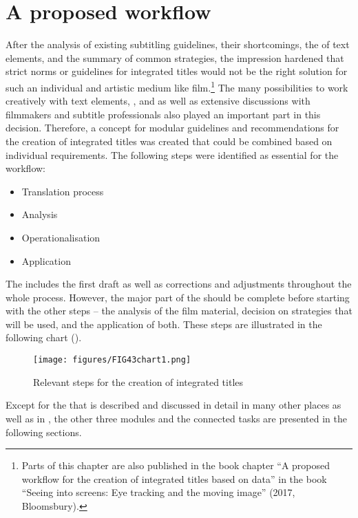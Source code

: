 \chapter{{A proposed workflow}}\label{workflow}

After the analysis of existing subtitling guidelines, their shortcomings, the  of text elements, and the summary of common  strategies, the impression hardened that strict norms or guidelines for integrated titles would not be the right solution for such an individual and artistic medium like film.\footnote{Parts of this chapter are also published in the book chapter “A proposed workflow for the creation of integrated titles based on  data” in the book “Seeing into screens: Eye tracking and the moving image” (2017, Bloomsbury).} The many possibilities to work creatively with text elements, , and  as well as extensive discussions with filmmakers and subtitle professionals also played an important part in this decision. Therefore, a concept for modular guidelines and recommendations for the creation of integrated titles was created that could be combined based on individual requirements. The following steps were identified as essential for the workflow:

\begin{itemize}
\item Translation process
\item Analysis
\item Operationalisation
\item Application
\end{itemize}

The  includes the first draft as well as corrections and adjustments throughout the whole process. However, the major part of the  should be complete before starting with the other steps – the analysis of the film material, decision on strategies that will be used, and the application of both. These steps are illustrated in the following chart ().

\begin{figure}
\texttt{[image: figures/FIG43chart1.png]}
\caption{Relevant steps for the creation of integrated titles}
\label{fig:FIG43}
\end{figure}

Except for the  that is described and discussed in detail in many other places as well as in , the other three modules and the connected tasks are presented in the following sections.

